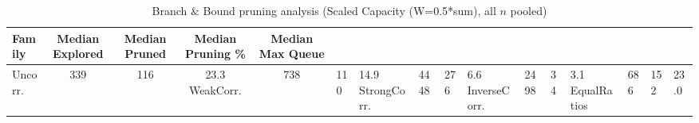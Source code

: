 \begin{table}[tb]
\centering
\caption{Branch $\&$ Bound pruning analysis (Scaled Capacity (W=0.5*sum), all $n$ pooled)}
\label{tab:scaled-bb-pruning}
\begin{tabular}{lcccc}
\toprule
Family & Median Explored & Median Pruned & Median Pruning \% & Median Max Queue \\
\midrule
Uncorr. & 339 & 116 & 23.3%
WeakCorr. & 738 & 110 & 14.9%
StrongCorr. & 4448 & 276 & 6.6%
InverseCorr. & 2498 & 34 & 3.1%
EqualRatios & 686 & 152 & 23.0%
\bottomrule
\end{tabular}
\end{table}
